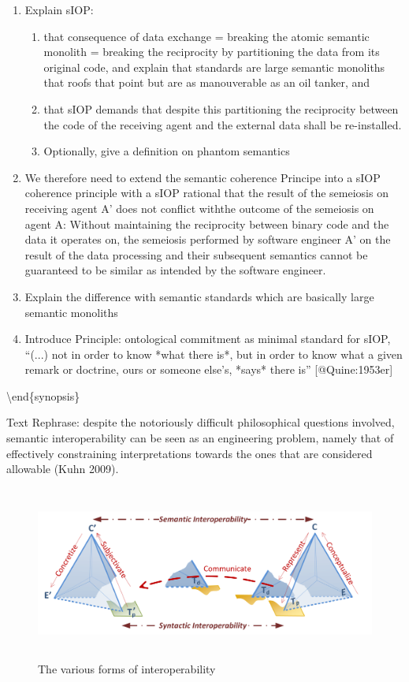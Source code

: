 \documentclass[a4paper,11pt,oneside,oldfontcommands]{memoir}
\theoremstyle{definition}
\theoremstyle{break}		%
\numberwithin{equation}{chapter}
\numberwithin{figure}{chapter}
\begin{document}
\begin{enumerate}
  \item Explain sIOP:
  \begin{enumerate}
    \item that consequence of data exchange = breaking the atomic semantic monolith = breaking the reciprocity by partitioning the data from its original code, and explain that standards are large semantic monoliths that roofs that point but are as manouverable as an oil tanker, and 
    \item that sIOP demands that despite this partitioning the reciprocity between the code of the receiving agent and the external data shall be re-installed.
    \item Optionally, give a definition on phantom semantics
  \end{enumerate}
  \item We therefore need to extend the semantic coherence Principe into a sIOP coherence principle with a sIOP rational that the result of the semeiosis on receiving agent A’ does not conflict withthe outcome of the semeiosis on agent A: Without maintaining the reciprocity between binary code and the data it operates on, the semeiosis performed by software engineer A’ on the result of the data processing and their subsequent semantics cannot be guaranteed to be similar as intended by the software engineer.
  \item Explain the difference with semantic standards which are basically large semantic monoliths
  \item Introduce Principle: ontological commitment as minimal standard for sIOP, “(...) not in order to know *what there is*, but in order to know what a given remark or doctrine, ours or someone else’s, *says* there is” [@Quine:1953er]
\end{enumerate}

\textbackslash{}end\{synopsis\}

Text Rephrase: despite the notoriously difficult philosophical questions
involved, semantic interoperability can be seen as an engineering
problem, namely that of effectively constraining interpretations towards
the ones that are considered allowable (Kuhn 2009).

\begin{figure}
\hypertarget{fig:2semiotic-triangles}{%
\centering
\includegraphics[width=5.3125in,height=2.25in]{src/images/2SemioticTriangles.png}
\caption{The various forms of
interoperability}\label{fig:2semiotic-triangles}
}
\end{figure}
\end{document}
